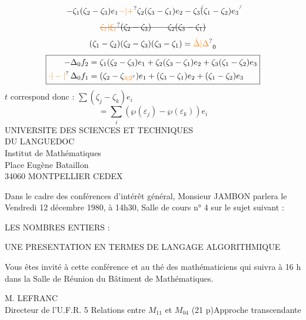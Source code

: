 \[
 -\zeta_1(\zeta_2-\zeta_3)e_1\unsure{-|+}\zeta_2(\zeta_3-\zeta_1)e_2-\zeta_3\rlap{\raisebox{1.5ex}{$\scriptscriptstyle/$}}(\zeta_1-\zeta_2)e_3\rlap{\raisebox{1.5ex}{$\scriptscriptstyle/$}}
\]
\[
 \deleted{\unsure{\zeta_1|\xi_1}(\zeta_2-\zeta_3)\qquad\zeta_2(\zeta_3-\zeta_1)}
\]
\[
 (\zeta_1-\zeta_2)(\zeta_2-\zeta_3)(\zeta_3-\zeta_1)=\unsure{\dot\Delta|\Delta}_0
\]
\[
 \boxed{\begin{aligned}
 -\Delta_0f_2&=\zeta_1(\zeta_2-\zeta_3)e_1+\zeta_2(\zeta_3-\zeta_1)e_2+\zeta_3(\zeta_1-\zeta_2)e_3\\
 \unsure{\cdot|-|{}}\,\Delta_0 f_1&=(\zeta_2-\zeta_{\unsure{3|2}})e_1+(\zeta_3-\zeta_1)e_2+(\zeta_1-\zeta_2)e_3
 \end{aligned}}
\]
$t$ correspond donc : $\sum(\zeta_j-\zeta_k)e_i$
\[
 =\sum_i(\wp(\varepsilon_j)-\wp(\varepsilon_k))e_i
\]
UNIVERSITE DES SCIENCES ET TECHNIQUES\\
DU LANGUEDOC\\
Institut de Mathématiques\\
Place Eugène Bataillon\\
34060 MONTPELLIER CEDEX

Dans le cadre des conférences d'intérêt général, Monsieur JAMBON parlera le Vendredi 12 décembre 1980, à 14h30, Salle de cours n° 4 sur le sujet suivant :

LES NOMBRES ENTIERS :

UNE PRESENTATION EN TERMES DE LANGAGE ALGORITHMIQUE

Vous êtes invité à cette conférence et au thé des mathématiciens qui suivra à 16 h dans la Salle de Réunion du Bâtiment de Mathématiques.

M. LEFRANC\\
Directeur de l'U.F.R. 5
Relations entre $M_{11}$ et $M_{04}$
(21 p)\qquad Approche transcendante
